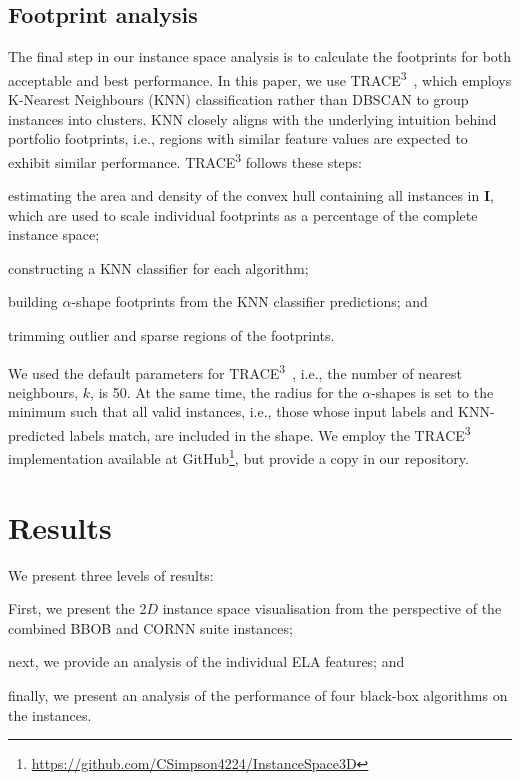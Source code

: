 \documentclass[acmsmall,screen,review,anonymous]{acmart}
\newcommand{\Ibf}{\mathbf{I}}
\begin{document}
\subsection{Footprint analysis}
The final step in our instance space analysis is to calculate the footprints for both acceptable and best performance. In this paper, we use TRACE\textsuperscript{3}~\cite{Simpson2025}, which employs K-Nearest Neighbours (KNN) classification rather than DBSCAN to group instances into clusters. KNN closely aligns with the underlying intuition behind portfolio footprints, i.e., regions with similar feature values are expected to exhibit similar performance. TRACE\textsuperscript{3} follows these steps: 
\begin{inparaenum}[(a)]
    \item estimating the area and density of the convex hull containing all instances in $\Ibf$, which are used to scale individual footprints as a percentage of the complete instance space;
    \item constructing a KNN classifier for each algorithm;
    \item building $\alpha$-shape footprints from the KNN classifier predictions; and
    \item trimming outlier and sparse regions of the footprints.
\end{inparaenum}

We used the default parameters for TRACE\textsuperscript{3}~\cite{Simpson2025}, i.e., the number of nearest neighbours, $k$, is 50. At the same time, the radius for the $\alpha$-shapes is set to the minimum such that all valid instances, i.e., those whose input labels and KNN-predicted labels match, are included in the shape. We employ the TRACE\textsuperscript{3} implementation available at GitHub\footnote{\url{https://github.com/CSimpson4224/InstanceSpace3D}}, but provide a copy in our repository.

\section{Results}\label{sec:results}
We present three levels of results:
\begin{inparaenum}[(a)]
    \item First, we present the 2$D$ instance space visualisation from the perspective of the combined BBOB and CORNN suite instances;
    \item next, we provide an analysis of the individual ELA features; and
    \item finally, we present an analysis of the performance of four black-box algorithms on the instances.
\end{inparaenum}
\end{document}

